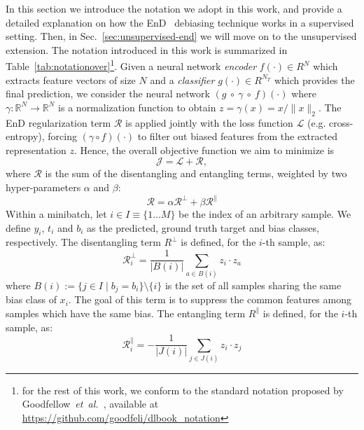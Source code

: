 In this section we introduce the notation we adopt in this work, and provide a detailed explanation on how the EnD~\cite{tartaglione2021end} debiasing technique works in a supervised setting. Then, in Sec.~\ref{sec:unsupervised-end} we will move on to the unsupervised extension. 
The notation introduced in this work is summarized in Table~\ref{tab:notationover}\footnote{for the rest of this work, we conform to the standard notation proposed by Goodfellow~\emph{et~al.}~\cite{GoodBengCour16}, available at \url{https://github.com/goodfeli/dlbook\_notation}}.
Given a neural network \emph{encoder} $f(\cdot) \in R^N$ %
which extracts feature vectors of size $N$ and a \emph{classifier} $g(\cdot) \in R^{N_T}$ which provides the final prediction, we consider the neural network $(g~\circ~\gamma~\circ~f)(\cdot)$
where $\gamma : \mathbb{R}^N \rightarrow \mathbb{R}^N$ is a normalization function to obtain $z = \gamma(x) = x/\|x\|_2$.
The EnD regularization term $\mathcal{R}$ is applied jointly with the loss function $\mathcal{L}$ (e.g. cross-entropy), forcing $(\gamma \circ f)(\cdot)$ to filter out biased features from the extracted representation $z$. 
Hence, the overall objective function we aim to minimize is
\begin{equation}
    \label{eq:uprule}
    \mathcal{J} = \mathcal{L} + \mathcal{R},
\end{equation}
where $\mathcal{R}$ is the sum of the disentangling and entangling terms, weighted by two hyper-parameters $\alpha$ and $\beta$:
\begin{equation}
\label{eq:objective-func}
    \mathcal{R} = \alpha\mathcal{R}^{\perp} + \beta\mathcal{R}^{\parallel}
\end{equation}
Within a minibatch, let $i \in I \equiv \{1\dots M\}$ be the index of an arbitrary sample. We define $y_i$, $t_i$ and $b_i$ as the predicted, ground truth target and bias classes, respectively. 
The disentangling term $R^{\perp}$ is defined, for the $i$-th sample, as: 
\begin{equation}
	\mathcal{R}^{\perp}_{i} = \frac{1}{|B(i)|} \sum_{a \in B(i)} z_i \cdot z_a
\end{equation}
where $B(i) := \{j \in I \mid b_j = b_i  \} \setminus \{i\}$ is the set of all samples sharing the same bias class of $x_i$. 
The goal of this term is to suppress the common features among samples which have the same bias. %
The entangling term $R^{\parallel}$ is defined, for the $i$-th sample, as:
\begin{equation}
	\mathcal{R}^{\parallel}_{i} = - \frac{1}{|J(i)|}\sum_{j \in J(i)} z_i \cdot z_j
\end{equation}
